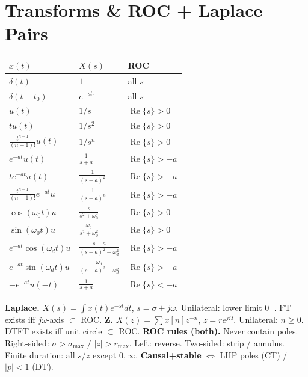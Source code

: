 \documentclass[11pt]{extarticle}
\renewcommand{\Re}{\operatorname{Re}}
\begin{document}
\section*{Transforms \& ROC + Laplace Pairs}

\begin{table}
  \begin{tabular}{@{}l l l@{}}
    \toprule
    $x(t)$ & $X(s)$ & ROC \\
    \midrule
    $\delta(t)$ & $1$ & all $s$ \\
    $\delta(t{-}t_0)$ & $e^{-st_0}$ & all $s$ \\
    $u(t)$ & $1/s$ & $\Re\{s\}{>}0$ \\
    $tu(t)$ & $1/s^2$ & $\Re\{s\}{>}0$ \\
    $\tfrac{t^{n-1}}{(n-1)!}u(t)$ & $1/s^n$ & $\Re\{s\}{>}0$ \\
    $e^{-at}u(t)$ & $\tfrac{1}{s{+}a}$ & $\Re\{s\}{>}{-}a$ \\
    $te^{-at}u(t)$ & $\tfrac{1}{(s{+}a)^2}$ & $\Re\{s\}{>}{-}a$ \\
    $\tfrac{t^{n-1}}{(n-1)!}e^{-at}u$ & $\tfrac{1}{(s{+}a)^n}$ & $\Re\{s\}{>}{-}a$ \\
    $\cos(\omega_0 t)u$ & $\tfrac{s}{s^2{+}\omega_0^2}$ & $\Re\{s\}{>}0$ \\
    $\sin(\omega_0 t)u$ & $\tfrac{\omega_0}{s^2{+}\omega_0^2}$ & $\Re\{s\}{>}0$ \\
    $e^{-at}\!\cos(\omega_d t)u$ & $\tfrac{s{+}a}{(s{+}a)^2{+}\omega_d^2}$ & $\Re\{s\}{>}{-}a$ \\
    $e^{-at}\!\sin(\omega_d t)u$ & $\tfrac{\omega_d}{(s{+}a)^2{+}\omega_d^2}$ & $\Re\{s\}{>}{-}a$ \\
    $-e^{-at}u(-t)$ & $\tfrac{1}{s{+}a}$ & $\Re\{s\}{<}{-}a$ \\
    \bottomrule
  \end{tabular}
\end{table}
\textbf{Laplace.} $X(s)=\!\int x(t)e^{-st}dt$, $s=\sigma+j\omega$. Unilateral: lower limit $0^-$. FT exists iff $j\omega$-axis $\subset$ ROC.
\textbf{Z.} $X(z)=\!\sum x[n]z^{-n}$, $z=re^{j\Omega}$. Unilateral: $n\ge 0$. DTFT exists iff unit circle $\subset$ ROC.
\textbf{ROC rules (both).} Never contain poles. Right-sided: $\sigma>\sigma_{\max}$ / $|z|>r_{\max}$. Left: reverse. Two-sided: strip / annulus. Finite duration: all $s$/$z$ except $0,\infty$. \textbf{Causal+stable} $\Leftrightarrow$ LHP poles (CT) / $|p|<1$ (DT).
\end{document}

